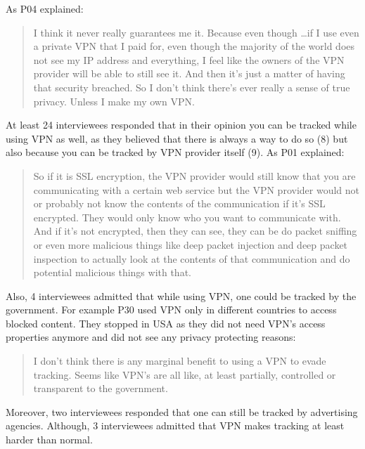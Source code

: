 As P04 explained: \begin{quote}I think it never really guarantees me it.
Because even though \dots if I use even a private VPN that I paid for, even
though the majority of the world does not see my IP address and everything, I
feel like the owners of the VPN provider will be able to still see it. And
then it's just a matter of having that security breached. So I don't think
there's ever really a sense of true privacy. Unless I make my own
VPN.\end{quote}

At least 24 interviewees responded that in their opinion you can be tracked
while using VPN as well, as they believed that there is always a way to do so
(8) but also because you can be tracked by VPN provider itself (9). 
As P01 explained:

\begin{quote}So if it is SSL encryption, the VPN provider would still know
that you are communicating with a certain web service but the VPN provider
would not or probably not know the contents of the communication if it's SSL
encrypted. They would only know who you want to communicate with. And if it's
not encrypted, then they can see, they can be do packet sniffing or even more
malicious things like deep packet injection and deep packet inspection to
actually look at the contents of that communication and do potential malicious
things with that. \end{quote}

Also, 4 interviewees admitted that while using VPN, one could be tracked by
the government. For example P30 used VPN only in different countries to access
blocked content. They stopped in USA as they did not need VPN's access
properties anymore and did not see any privacy protecting reasons:

\begin{quote}I don't think there is any marginal benefit to using a VPN to
evade tracking. Seems like VPN's are all like, at least partially, controlled
or transparent to the government.\end{quote}

 Moreover, two interviewees responded that one can still be tracked by
 advertising agencies. Although, 3 interviewees admitted that VPN makes
 tracking at least harder than normal. 

